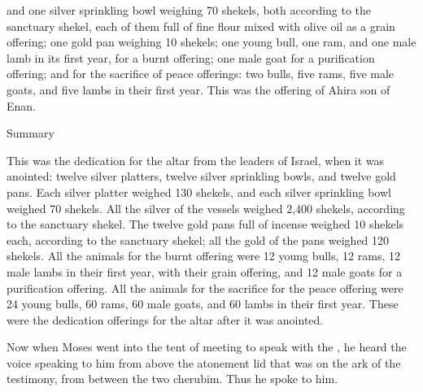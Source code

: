 {and one
silver
sprinkling bowl
weighing 70
shekels,
both according to the sanctuary
shekel,
each of them
full
of fine flour
mixed
with olive oil
as a grain offering;
one
gold
pan
weighing
10
shekels;
one
young
bull,
one ram,
and one
male lamb
in its first
year,
for a burnt offering;
one
male
goat
for a purification offering;
and for the sacrifice
of peace offerings: two
bulls,
five
rams,
five
male goats,
and five
lambs
in their first year.
This
was the offering
of Ahira
son
of Enan.
\par }{\SH Summary
\par }{\PP {}This
was the dedication
for the altar
from the leaders
of Israel,
when
it was anointed: twelve
silver
platters,
twelve
silver
sprinkling bowls,
and twelve
gold
pans.
Each
silver
platter
weighed 130
shekels, and each
silver sprinkling bowl
weighed 70
shekels. All
the silver
of the vessels
weighed 2,400
shekels, according to the sanctuary
shekel.
The twelve
gold
pans
full
of incense
weighed 10
shekels each,
according to the sanctuary
shekel;
all
the gold
of the pans
weighed 120 shekels.
All
the animals
for the burnt offering
were 12
young bulls,
12 rams,
12
male lambs
in their first year,
with their grain offering,
and 12
male
goats
for a purification offering.
All
the animals
for the sacrifice
for the peace offering
were 24
young bulls,
60
rams,
60 male goats,
and 60
lambs
in their first year.
These
were the dedication
offerings for the altar
after
it was anointed.
\par }{\PP {}Now when Moses
went
into
the tent
of meeting
to speak
with
the
{}, he heard
the voice
speaking
to
him from above
the atonement lid
that
was on
the ark
of the testimony,
from between
the two
cherubim.
Thus he spoke
to him.


}
